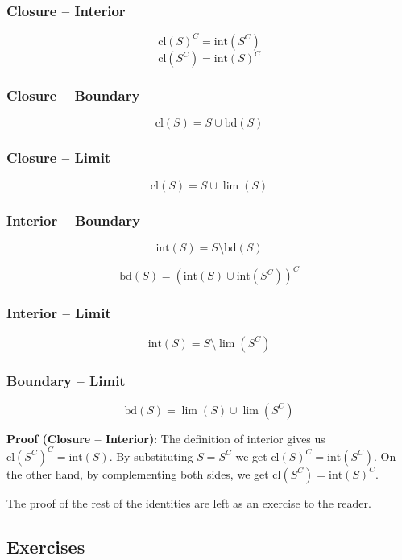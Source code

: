 \documentclass{report}
\newcommand{\cl}{\mathrm{cl}}
\newcommand{\intr}{\mathrm{int}}
\newcommand{\bd}{\mathrm{bd}}
\begin{document}
\begin{multicols}{2}

\subsubsection*{Closure -- Interior}

$$\cl(S)^C = \intr(S^C)$$
$$\cl(S^C) = \intr(S)^C$$

\subsubsection*{Closure -- Boundary}

$$\cl(S) = S∪\bd(S)$$

\subsubsection*{Closure -- Limit}

$$\cl(S) = S∪\lim(S)$$

\subsubsection*{Interior -- Boundary}

$$\intr(S) = S \setminus \bd(S)$$

$$\bd(S) = (\intr(S)∪\intr(S^C))^C$$

\subsubsection*{Interior -- Limit}

$$\intr(S) = S \setminus \lim(S^C) $$

\subsubsection*{Boundary -- Limit}

$$\bd(S) = \lim(S)∪\lim(S^C)$$

\end{multicols}

{\bf Proof (Closure -- Interior)}: The definition of interior gives us $\cl(S^C)^C = \intr(S)$. By substituting $S=S^C$ we get $\cl(S)^C = \intr(S^C)$. On the other hand, by complementing both sides, we get $\cl(S^C) = \intr(S)^C$.

The proof of the rest of the identities are left as an exercise to the reader.


\subsection*{Exercises}
\end{document}
